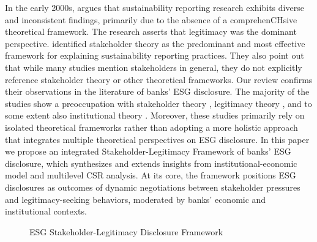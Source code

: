 \documentclass[
  authoryear]{elsarticle}
\makeatletter
\newcommand*\pandocbounded[1]{%
  \sbox\pandoc@box{#1}%
  \Gscale@div\@tempa{\textheight}{\dimexpr\ht\pandoc@box+\dp\pandoc@box\relax}%
  \Gscale@div\@tempb{\linewidth}{\wd\pandoc@box}%
  \ifdim\@tempb\p@<\@tempa\p@\let\@tempa\@tempb\fi%
  \ifdim\@tempa\p@<\p@\scalebox{\@tempa}{\usebox\pandoc@box}%
  \else\usebox{\pandoc@box}%
  \fi%
}
\makeatother
\begin{document}
In the early 2000s, \citet{HOOGHIEMSTRA2000} argues that sustainability
reporting research exhibits diverse and inconsistent findings, primarily
due to the absence of a comprehenCHsive theoretical framework. The
research asserts that legitimacy was the dominant perspective.
\citet{SPENCE2010} identified stakeholder theory as the predominant and
most effective framework for explaining sustainability reporting
practices. They also point out that while many studies mention
stakeholders in general, they do not explicitly reference stakeholder
theory or other theoretical frameworks. Our review confirms their
observations in the literature of banks' ESG disclosure. The majority of
the studies show a preoccupation with stakeholder theory
\citep{GALANT2017, SHEN2016, BUALLAY2021}, legitimacy theory
\citep[e.g.][]{CARNEVALE2014}, and to some extent also institutional
theory \citep{HIGGINS2014, BEBBINGTON2018, CHRISTENSEN2021}. Moreover,
these studies primarily rely on isolated theoretical frameworks rather
than adopting a more holistic approach that integrates multiple
theoretical perspectives on ESG disclosure. In this paper we propose an
integrated Stakeholder-Legitimacy Framework of banks' ESG disclosure,
which synthesizes and extends insights from \citet{CAMPBELL2007}
institutional-economic model and \citet{AGUINIS2012} multilevel CSR
analysis. At its core, the framework positions ESG disclosures as
outcomes of dynamic negotiations between stakeholder pressures and
legitimacy-seeking behaviors, moderated by banks' economic and
institutional contexts.

\begin{figure}

\centering{

\pandocbounded{\texttt{[image: flowchart.pdf]}}

}

\caption{\label{fig-flowchart}ESG Stakeholder-Legitimacy Disclosure
Framework}

\end{figure}%
\end{document}

